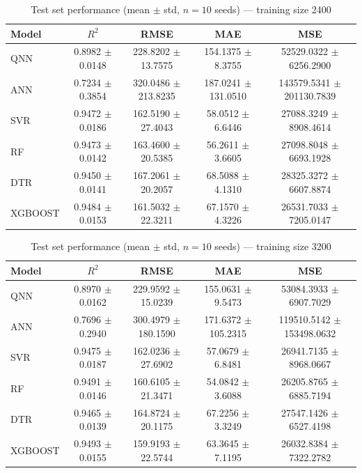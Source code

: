 \begin{table}[htbp]
\centering
\caption{Test set performance (mean $\pm$ std, $n=10$ seeds) — training size 2400}
\label{tab:results_2400}
\begin{tabular}{lcccc}
\toprule
Model & $R^2$ & RMSE & MAE & MSE \\
\midrule
QNN & 0.8982 $\pm$ 0.0148 & 228.8202 $\pm$ 13.7575 & 154.1375 $\pm$ 8.3755 & 52529.0322 $\pm$ 6256.2900 \\
ANN & 0.7234 $\pm$ 0.3854 & 320.0486 $\pm$ 213.8235 & 187.0241 $\pm$ 131.0510 & 143579.5341 $\pm$ 201130.7839 \\
SVR & 0.9472 $\pm$ 0.0186 & 162.5190 $\pm$ 27.4043 & 58.0512 $\pm$ 6.6446 & 27088.3249 $\pm$ 8908.4614 \\
RF & 0.9473 $\pm$ 0.0142 & 163.4600 $\pm$ 20.5385 & 56.2611 $\pm$ 3.6605 & 27098.8048 $\pm$ 6693.1928 \\
DTR & 0.9450 $\pm$ 0.0141 & 167.2061 $\pm$ 20.2057 & 68.5088 $\pm$ 4.1310 & 28325.3272 $\pm$ 6607.8874 \\
XGBOOST & 0.9484 $\pm$ 0.0153 & 161.5032 $\pm$ 22.3211 & 67.1570 $\pm$ 4.3226 & 26531.7033 $\pm$ 7205.0147 \\
\bottomrule
\end{tabular}
\end{table}

\begin{table}[htbp]
\centering
\caption{Test set performance (mean $\pm$ std, $n=10$ seeds) — training size 3200}
\label{tab:results_3200}
\begin{tabular}{lcccc}
\toprule
Model & $R^2$ & RMSE & MAE & MSE \\
\midrule
QNN & 0.8970 $\pm$ 0.0162 & 229.9592 $\pm$ 15.0239 & 155.0631 $\pm$ 9.5473 & 53084.3933 $\pm$ 6907.7029 \\
ANN & 0.7696 $\pm$ 0.2940 & 300.4979 $\pm$ 180.1590 & 171.6372 $\pm$ 105.2315 & 119510.5142 $\pm$ 153498.0632 \\
SVR & 0.9475 $\pm$ 0.0187 & 162.0236 $\pm$ 27.6902 & 57.0679 $\pm$ 6.8481 & 26941.7135 $\pm$ 8968.0667 \\
RF & 0.9491 $\pm$ 0.0146 & 160.6105 $\pm$ 21.3471 & 54.0842 $\pm$ 3.6088 & 26205.8765 $\pm$ 6885.7194 \\
DTR & 0.9465 $\pm$ 0.0139 & 164.8724 $\pm$ 20.1175 & 67.2256 $\pm$ 3.3249 & 27547.1426 $\pm$ 6527.4198 \\
XGBOOST & 0.9493 $\pm$ 0.0155 & 159.9193 $\pm$ 22.5744 & 63.3645 $\pm$ 7.1195 & 26032.8384 $\pm$ 7322.2782 \\
\bottomrule
\end{tabular}
\end{table}